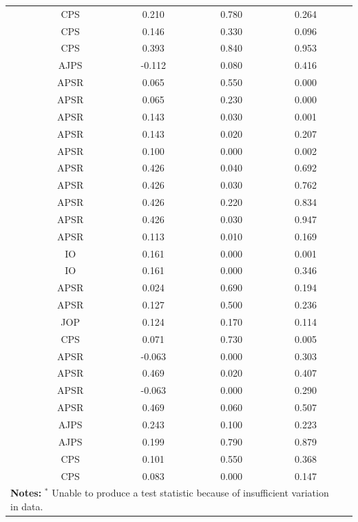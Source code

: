 \documentclass[12pt]{article}
\begin{document}
\begin{table}[!ht]
\begin{tabular}{lccccc}
      \citet{Clark_2014}  & CPS & 0.210 & 0.780 & 0.264 \\ 
       \citet{Hellwig2007}  & CPS & 0.146 & 0.330 & 0.096 \\ 
      \citet{Hellwig2007}   & CPS & 0.393 & 0.840 & 0.953 \\ 
      \citet{Hicken2008}  & AJPS & -0.112 & 0.080 & 0.416 \\ 
       \citet{huddy2015expressive} & APSR & 0.065 & 0.550 & 0.000 \\ 
     \citet{huddy2015expressive}  & APSR & 0.065 & 0.230 & 0.000 \\ 
       \citet{Kim2013}  & APSR & 0.143 & 0.030 & 0.001 \\ 
       \citet{Kim2013}  & APSR & 0.143 & 0.020 & 0.207 \\ 
       \citet{Kim2013}  & APSR & 0.100 & 0.000 & 0.002 \\ 
      \citet{malesky2012adverse} & APSR & 0.426 & 0.040 & 0.692 \\ 
     \citet{malesky2012adverse}  & APSR & 0.426 & 0.030 & 0.762 \\ 
       \citet{malesky2012adverse}  & APSR & 0.426 & 0.220 & 0.834 \\ 
      \citet{malesky2012adverse}  & APSR & 0.426 & 0.030 & 0.947 \\ 
\citet{Neblo2010} & APSR & 0.113 & 0.010 & 0.169 \\ 
     \citet{Pelc2011}   & IO & 0.161 & 0.000 & 0.001 \\ 
   \citet{Pelc2011}  & IO & 0.161 & 0.000 & 0.346 \\ 
 \citet{Petersen2013} & APSR & 0.024 & 0.690 & 0.194 \\ 
 \citet{Petersen2013} & APSR & 0.127 & 0.500 & 0.236 \\ 
     \citet{Somer2009}   & JOP & 0.124 & 0.170 & 0.114 \\ 
  \citet{Tavits2008}  & CPS & 0.071 & 0.730 & 0.005 \\ 
     \citet{Truex2014} & APSR & -0.063 & 0.000 & 0.303 \\ 
        \citet{Truex2014}  & APSR & 0.469 & 0.020 & 0.407 \\ 
     \citet{Truex2014} & APSR & -0.063 & 0.000 & 0.290 \\ 
      \citet{Truex2014}  & APSR & 0.469 & 0.060 & 0.507 \\ 
   \citet{Vernby2013}  & AJPS & 0.243 & 0.100 & 0.223 \\ 
     \citet{Vernby2013}  & AJPS & 0.199 & 0.790 & 0.879 \\ 
\citet{Williams2011}   & CPS & 0.101 & 0.550 & 0.368 \\ 
     \citet{Williams2011}    & CPS & 0.083 & 0.000 & 0.147 \\     \hline
    \multicolumn{5}{p{35em}}{{\bf Notes:} $^{*}$ Unable to produce a test statistic because of
    insufficient variation in data.}
\end{tabular}
\end{table}            

  

\clearpage


\singlespacing
\end{document}
